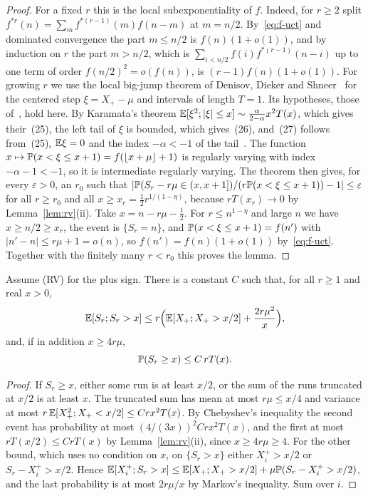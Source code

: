 \begin{proof}
For a fixed $r$ this is the local subexponentiality of $f$. Indeed, for $r\ge2$
split $f^{*r}(n)=\sum_mf^{*(r-1)}(m)f(n-m)$ at $m=n/2$. By~\eqref{eq:f-uct} and
dominated convergence the part $m\le n/2$ is $f(n)(1+o(1))$, and by induction on $r$
the part $m>n/2$, which is $\sum_{i<n/2}f(i)f^{*(r-1)}(n-i)$ up to one term of order
$f(n/2)^2=o(f(n))$, is $(r-1)f(n)(1+o(1))$. For growing $r$ we use the local
big-jump theorem of Denisov, Dieker and Shneer~\cite[Theorem~9.1]{dds2008} for the
centered step $\xi=X_\plus-\mu$ and intervals of length $T=1$. Its hypotheses, those
of~\cite[Proposition~9.1]{dds2008}, hold here. By Karamata's theorem
$\mathbb{E}[\xi^2;|\xi|\le x]\sim\frac{\alpha}{2-\alpha}x^2T(x)$, which gives their~(25), the left
tail of $\xi$ is bounded, which gives~(26), and~(27) follows from~(25),
$\mathbb{E}\xi=0$ and the index $-\alpha<-1$ of the tail~\cite[Lemma~9.1]{dds2008}. The function
$x\mapsto\mathbb{P}(x<\xi\le x+1)=f(\lfloor x+\mu\rfloor+1)$ is regularly varying with
index $-\alpha-1<-1$, so it is intermediate regularly varying. The theorem then
gives, for every $\varepsilon>0$, an $r_0$ such that
$|\mathbb{P}(S_r-r\mu\in(x,x+1])/(r\mathbb{P}(x<\xi\le x+1))-1|\le\varepsilon$ for all $r\ge r_0$ and
all $x\ge x_r=\frac12r^{1/(1-\eta)}$, because $rT(x_r)\to0$ by
Lemma~\ref{lem:rv}(ii). Take $x=n-r\mu-\frac12$. For $r\le n^{1-\eta}$ and large $n$ we
have $x\ge n/2\ge x_r$, the event is $\{S_r=n\}$, and
$\mathbb{P}(x<\xi\le x+1)=f(n')$ with $|n'-n|\le r\mu+1=o(n)$, so $f(n')=f(n)(1+o(1))$
by~\eqref{eq:f-uct}. Together with the finitely many $r<r_0$ this proves the lemma.
\end{proof}

\begin{lemma}\label{lem:sums}
Assume (RV) for the plus sign. There is a constant $C$ such that, for all $r\ge1$
and real $x>0$,
\[
 \mathbb{E}[S_r;S_r>x]\le r\Bigl(\mathbb{E}[X_{+};X_{+}>x/2]+\frac{2r\mu^2}{x}\Bigr),
\]
and, if in addition $x\ge4r\mu$,
\[
 \mathbb{P}(S_r\ge x)\le C\,rT(x).
\]
\end{lemma}

\begin{proof}
If $S_r\ge x$, either some run is at least $x/2$, or the sum of the runs
truncated at $x/2$ is at least $x$. The truncated sum has mean at most
$r\mu\le x/4$ and variance at most $r\,\mathbb{E}[X_{+}^2;X_{+}<x/2]\le Crx^2T(x)$. By
Chebyshev's inequality the second event has probability at most
$(4/(3x))^2Crx^2T(x)$, and the first at most $rT(x/2)\le CrT(x)$ by
Lemma~\ref{lem:rv}(ii), since $x\ge4r\mu\ge4$. For the other bound, which uses no
condition on $x$, on $\{S_r>x\}$ either $X^\plus_i>x/2$ or $S_r-X^\plus_i>x/2$.
Hence $\mathbb{E}[X^{+}_i;S_r>x]\le\mathbb{E}[X_{+};X_{+}>x/2]+\mu\mathbb{P}(S_r-X^{+}_i>x/2)$, and the
last probability is at most $2r\mu/x$ by Markov's inequality. Sum over $i$.
\end{proof}

